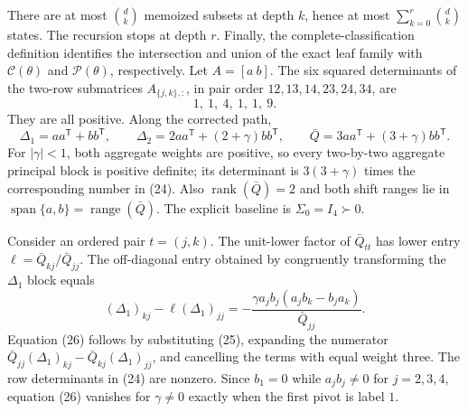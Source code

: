There are at most \(\binom dk\) memoized subsets at depth \(k\), hence at most \(\sum_{k=0}^r\binom dk\) states.  The recursion stops at depth \(r\).  Finally, the complete-classification definition identifies the intersection and union of the exact leaf family with \(\mathcal C(\theta)\) and \(\mathcal P(\theta)\), respectively.
Let \(A=[a\ b]\).  The six squared determinants of the two-row submatrices \(A_{\{j,k\},:}\), in pair order \(12,13,14,23,24,34\), are
\[
 1,\ 1,\ 4,\ 1,\ 1,\ 9. \tag{24}
\]
They are all positive.  Along the corrected path,
\[
 \Delta_1=aa^{\mathsf T}+bb^{\mathsf T},\qquad
 \Delta_2=2aa^{\mathsf T}+(2+\gamma)bb^{\mathsf T},\qquad
 \bar Q=3aa^{\mathsf T}+(3+\gamma)bb^{\mathsf T}. \tag{25}
\]
For \(|\gamma|<1\), both aggregate weights are positive, so every two-by-two aggregate principal block is positive definite; its determinant is \(3(3+\gamma)\) times the corresponding number in (24).  Also \(\operatorname{rank}(\bar Q)=2\) and both shift ranges lie in \(\operatorname{span}\{a,b\}=\operatorname{range}(\bar Q)\).  The explicit baseline is \(\Sigma_0=I_4\succ0\).

Consider an ordered pair \(t=(j,k)\).  The unit-lower factor of \(\bar Q_{tt}\) has lower entry \(\ell=\bar Q_{kj}/\bar Q_{jj}\).  The off-diagonal entry obtained by congruently transforming the \(\Delta_1\) block equals
\[
 (\Delta_1)_{kj}-\ell(\Delta_1)_{jj}
 =-\frac{\gamma a_jb_j(a_jb_k-b_ja_k)}{\bar Q_{jj}}. \tag{26}
\]
Equation (26) follows by substituting (25), expanding the numerator
\(\bar Q_{jj}(\Delta_1)_{kj}-\bar Q_{kj}(\Delta_1)_{jj}\), and cancelling the terms with equal weight three.  The row determinants in (24) are nonzero.  Since \(b_1=0\) while \(a_jb_j\ne0\) for \(j=2,3,4\), equation (26) vanishes for \(\gamma\ne0\) exactly when the first pivot is label \(1\).

